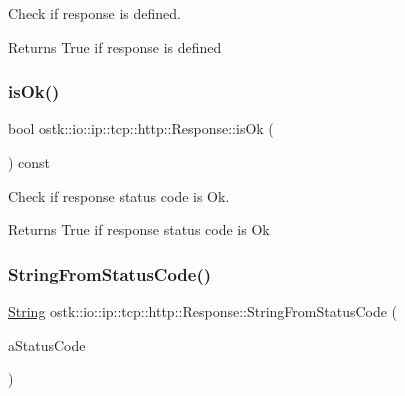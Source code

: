 Check if response is defined. 

\begin{DoxyReturn}{Returns}
True if response is defined 
\end{DoxyReturn}
\mbox{\label{classostk_1_1io_1_1ip_1_1tcp_1_1http_1_1_response_a44768f02be45b9363a00a12c33aa112d}} 
\subsubsection{\texorpdfstring{is\+Ok()}{isOk()}}
{\footnotesize\ttfamily bool ostk\+::io\+::ip\+::tcp\+::http\+::\+Response\+::is\+Ok (\begin{DoxyParamCaption}{ }\end{DoxyParamCaption}) const}



Check if response status code is Ok. 

\begin{DoxyReturn}{Returns}
True if response status code is Ok 
\end{DoxyReturn}
\mbox{\label{classostk_1_1io_1_1ip_1_1tcp_1_1http_1_1_response_a4a593d62047c96eead840c751972ffd4}} 
\subsubsection{\texorpdfstring{String\+From\+Status\+Code()}{StringFromStatusCode()}}
{\footnotesize\ttfamily \hyperlink{namespaceostk_1_1io_1_1ip_1_1tcp_1_1http_a88a1b82fb01d02df64ca01ef4058bbef}{String} ostk\+::io\+::ip\+::tcp\+::http\+::\+Response\+::\+String\+From\+Status\+Code (\begin{DoxyParamCaption}\item[{const \hyperlink{classostk_1_1io_1_1ip_1_1tcp_1_1http_1_1_response_af537657bbf13ea832203957144230c36}{Response\+::\+Status\+Code} \&}]{a\+Status\+Code }\end{DoxyParamCaption})\hspace{0.3cm}{\ttfamily [static]}}



